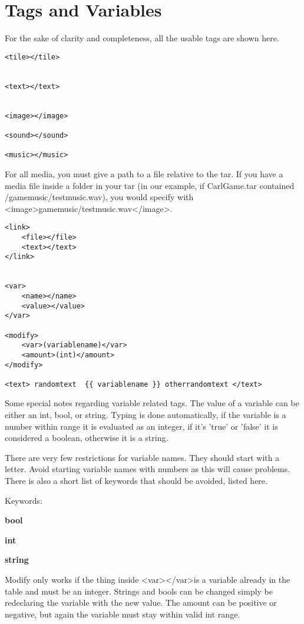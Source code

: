\documentclass[11pt]{article}
\begin{document}
\section{Tags and Variables}

For the sake of clarity and completeness, all the usable tags are shown here. 

\begin{lstlisting}
<tile></tile>


<text></text>


<image></image>

<sound></sound>

<music></music>
\end{lstlisting}

For all media, you must give a path to a file relative to the tar. If you have a media file inside a folder in your tar (in our example, if CarlGame.tar contained /gamemusic/testmusic.wav), you would specify with \textless image\textgreater gamemusic/testmusic.wav\textless /image\textgreater. 
	
\begin{lstlisting}
<link>
	<file></file>
	<text></text>
</link>


<var>
	<name></name>
	<value></value>
</var>

<modify>
	<var>(variablename)</var>
	<amount>(int)</amount>
</modify>

<text> randomtext  {{ variablename }} otherrandomtext </text>

\end{lstlisting}

Some special notes regarding variable related tags. The value of a variable can be either an int, bool, or string. Typing is done automatically, if the variable is a number within range it is evaluated as an integer, if it's 'true' or 'false' it is considered a boolean, otherwise it is a string. 

There are very few restrictions for variable names. They should start with a letter. Avoid starting variable names with numbers as this will cause problems. There is also a short list of keywords that should be avoided, listed here.

Keywords:

\textbf{bool}

\textbf{int}

\textbf{string}

Modify only works if the thing inside \textless var\textgreater \textless /var\textgreater is a variable already in the table and must be an integer. Strings and bools can be changed simply be redeclaring the variable with the new value. The amount can be positive or negative, but again the variable must stay within valid int range. 
\end{document}
